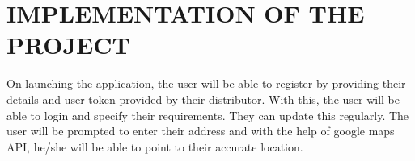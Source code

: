 
\chapter{\uppercase{Implementation of the Project}} %
\label{ch:chap3} %
On launching the application, the user will be able to register by providing their details and user token provided by their distributor. With this, the user will be able to login and specify their requirements. They can update this regularly. The user will be prompted to enter their address and with the help of  google maps API, he/she will be able to point to their accurate location. 










